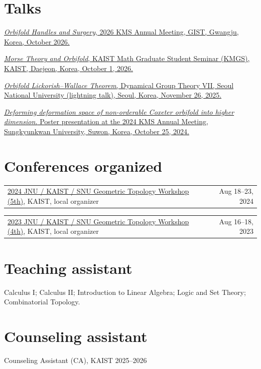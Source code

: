 \documentclass[11pt,a4paper]{article}
\makeatletter
\newcommand{\cvitem}[1]{\par\noindent #1\par\vspace{0.27em}}
\newcommand{\cvdated}[2]{%
  \noindent\begin{tabularx}{\linewidth}{@{}Xr@{}}
    #1 & #2
  \end{tabularx}\par}
\newcommand{\cvtalk}[2]{\cvitem{\href{#1}{#2}}}
\makeatother
\begin{document}
\section*{Talks}
\cvtalk{https://www.kms.or.kr/conference/abstract/search_view.html?num=10790\&uid=94\&period=94}{\emph{Orbifold Handles and Surgery}, 2026 KMS Annual Meeting, GIST, Gwangju, Korea, October 2026.}
\cvtalk{https://mathsci.kaist.ac.kr/gradseminar/notice/notice-61st-kmgs-on-october-1-thu-2026/}{\emph{Morse Theory and Orbifold}, KAIST Math Graduate Student Seminar (KMGS), KAIST, Daejeon, Korea, October 1, 2026.}
\cvtalk{https://sites.google.com/view/dgtvii/abstracts}{\emph{Orbifold Lickorish--Wallace Theorem}, Dynamical Group Theory VII, Seoul National University (lightning talk), Seoul, Korea, November 26, 2025.}
\cvtalk{https://www.kms.or.kr/conference/abstract/search_view.html?num=9501\&uid=88\&period=88\&section=Poster\%20Session}{\emph{Deforming deformation space of non-orderable Coxeter orbifold into higher dimension.} Poster presentation at the 2024 KMS Annual Meeting, Sungkyunkwan University, Suwon, Korea, October 25, 2024.}

\section*{Conferences organized}
\cvdated{\href{https://sites.google.com/view/gtworkshop2024kaist/home}{2024 JNU / KAIST / SNU Geometric Topology Workshop (5th)}, KAIST, local organizer}{Aug 18--23, 2024}
\cvdated{\href{https://mathsci.kaist.ac.kr/~schoi/research.html}{2023 JNU / KAIST / SNU Geometric Topology Workshop (4th)}, KAIST, local organizer}{Aug 16--18, 2023}

\section*{Teaching assistant}
Calculus I; Calculus II; Introduction to Linear Algebra; Logic and Set Theory; Combinatorial Topology.

\section*{Counseling assistant}
Counseling Assistant (CA), KAIST \hfill 2025--2026
\end{document}
